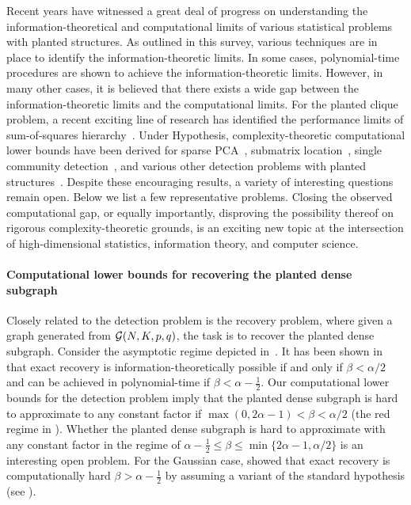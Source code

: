	Recent years have witnessed a great deal of progress on understanding the information-theoretical and
	computational limits of various statistical problems with planted structures. As outlined in this survey,
	various techniques are in place to identify the information-theoretic limits. In some cases, 
	polynomial-time procedures are shown to achieve the information-theoretic limits. However, in many
	other cases, it is believed that there exists a wide gap between the information-theoretic limits and
	the computational limits. For the planted clique problem,
	a recent exciting line of research has identified the performance limits of sum-of-squares hierarchy~\cite{Meka15,DeshpandeMontanari15,HKP15,RS15,barak-etal-planted-clique}. Under \PC Hypothesis, complexity-theoretic
	computational lower bounds have been derived for sparse PCA~\cite{berthet2013lowerSparsePCA}, 
	submatrix location~\cite{ma2013submatrix}, single community detection~\cite{HajekWuXu14}, and various other detection problems with
	planted structures~\cite{Brennan18}.
	 Despite these encouraging results, a variety of interesting questions remain open. Below we list a few representative problems.
	 Closing the observed computational gap, or equally importantly, disproving the possibility thereof on rigorous complexity-theoretic grounds, is an exciting new topic at the intersection of high-dimensional statistics, information theory, and computer science.

\paragraph{Computational lower bounds for recovering the planted dense subgraph} 
Closely related to the \PDS detection problem is the recovery problem, where given a graph generated from ${\mathcal{G}}(N,K,p,q)$, the task is to recover the planted dense subgraph. Consider the asymptotic regime 
depicted in~. It has been shown in \cite{ChenXu14,ames2013robust} that exact recovery is 
information-theoretically possible if and only if $\beta<\alpha/2$ and can be achieved in polynomial-time if 
$\beta<\alpha -\frac{1}{2}$. Our computational lower bounds for the \PDS detection problem imply that 
the planted dense subgraph is hard to approximate to any constant factor if $ \max(0,2\alpha-1) <\beta<\alpha/2$ (the red regime in ). Whether the planted dense subgraph is hard to approximate with any constant factor in the regime 
of $ \alpha -\frac{1}{2} \le \beta \le \min\{ 2\alpha-1, \alpha/2\}$ is an interesting open problem.
For the Gaussian case, \cite{CLR15} showed that exact recovery is computationally hard $\beta>\alpha -\frac{1}{2}$ by assuming 
a variant of the standard \PC hypothesis (see \cite[p.~1425]{CLR15}).
 

